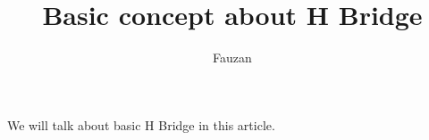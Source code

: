 \documentclass{article}
\title{Basic concept about H Bridge}
\author{Fauzan}
\begin{document}
\newcommand{\inlncd}[1]{\colorbox{lgray}{\texttt{#1}}}

\maketitle



We will talk about basic H Bridge in this article.
\end{document}
